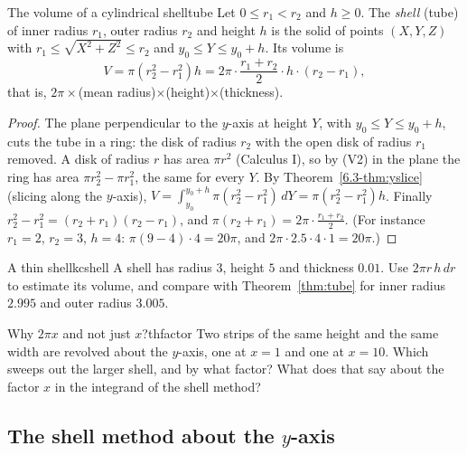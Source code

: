 \documentclass[11pt]{article}
\begin{document}
\begin{thm}{The volume of a cylindrical shell}{tube}
Let $0\le r_1<r_2$ and $h\ge0$. The \emph{shell} (tube) of inner radius $r_1$, outer radius $r_2$ and height $h$ is the solid of points $(X,Y,Z)$ with $r_1\le\sqrt{X^2+Z^2}\le r_2$ and $y_0\le Y\le y_0+h$. Its volume is
\[
V=\pi\left(r_2^2-r_1^2\right)h=2\pi\cdot\frac{r_1+r_2}2\cdot h\cdot(r_2-r_1),
\]
that is, $2\pi\times$(mean radius)$\times$(height)$\times$(thickness).
\end{thm}
\begin{proof}
The plane perpendicular to the $y$-axis at height $Y$, with $y_0\le Y\le y_0+h$, cuts the tube in a ring: the disk of radius $r_2$ with the open disk of radius $r_1$ removed. A disk of radius $r$ has area $\pi r^2$ (Calculus I), so by (V2) in the plane the ring has area $\pi r_2^2-\pi r_1^2$, the same for every $Y$. By Theorem~\ref{6.3-thm:yslice} (slicing along the $y$-axis), $V=\int_{y_0}^{y_0+h}\pi(r_2^2-r_1^2)\,dY=\pi(r_2^2-r_1^2)h$. Finally $r_2^2-r_1^2=(r_2+r_1)(r_2-r_1)$, and $\pi(r_2+r_1)=2\pi\cdot\frac{r_1+r_2}2$. (For instance $r_1=2$, $r_2=3$, $h=4$: $\pi(9-4)\cdot4=20\pi$, and $2\pi\cdot2.5\cdot4\cdot1=20\pi$.)
\end{proof}

\begin{kc}{A thin shell}{kcshell}
A shell has radius $3$, height $5$ and thickness $0.01$. Use $2\pi r\,h\,dr$ to estimate its volume, and compare with Theorem~\ref{thm:tube} for inner radius $2.995$ and outer radius $3.005$.
\end{kc}

\begin{think}{Why $2\pi x$ and not just $x$?}{thfactor}
Two strips of the same height and the same width are revolved about the $y$-axis, one at $x=1$ and one at $x=10$. Which sweeps out the larger shell, and by what factor? What does that say about the factor $x$ in the integrand of the shell method?
\end{think}

\subsection*{The shell method about the $y$-axis}
\end{document}
